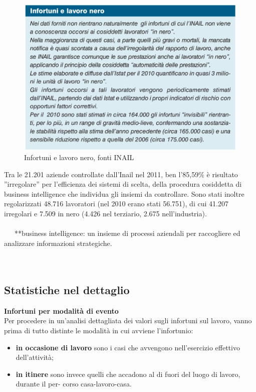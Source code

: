 \begin{figure}[H]
\centering
\includegraphics[scale=0.4]{images/cap4/analisiDiMercato/infortuniLavoroNero}
\caption{Infortuni e lavoro nero, fonti INAIL}
\end{figure}

Tra le 21.201 aziende controllate dall'Inail nel 2011, ben l’85,59\% è risultato ''irregolare'' per l’efficienza dei sistemi di scelta, della procedura cosiddetta di business intelligence che individua gli insiemi da controllare. Sono stati inoltre regolarizzati 48.716 lavoratori (nel 2010 erano stati 56.751), di cui 41.207 irregolari e 7.509 in nero (4.426 nel terziario, 2.675 nell’industria).\\\\



\
\
\
**business intelligence: un insieme di processi aziendali per raccogliere ed analizzare informazioni strategiche.\\\\

\ \
\subsection{Statistiche nel dettaglio}

\textbf{Infortuni per modalità di evento}\\
Per procedere in un’analisi dettagliata dei valori sugli infortuni sul lavoro, vanno prima di tutto distinte le modalità in cui avviene l’infortunio:

\begin{itemize}
\item \textbf{in occasione di lavoro} sono i casi che avvengono nell’esercizio effettivo dell’attività;
\item \textbf{in itinere} sono invece quelli che accadono al di fuori del luogo di lavoro, durante il per-
corso casa-lavoro-casa.
\end{itemize}


